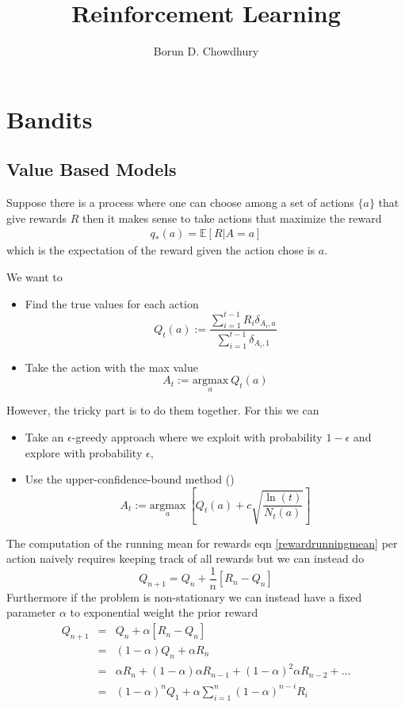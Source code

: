 \documentclass[11pt,a4paper]{article}
\title{Reinforcement Learning}
\author{Borun D. Chowdhury}
\newcommand\be{\begin{equation}}
\newcommand\bea{\begin{eqnarray}}
\newcommand\ee{\end{equation}}
\newcommand\eea{\end{eqnarray}}
\newcommand{\nn}{\nonumber \\}
\newcommand{\e}[1]{\mathbb E[#1]}
\newcommand{\todo}[1]{{\color{cyan}{TODO: #1}}}
\begin{document}
\maketitle

\section{Bandits}


\subsection{Value Based Models}

Suppose there is a process where one can choose among a set of actions $\{a\}$ that give rewards $R$ then it makes sense to take actions that maximize the reward
\bea
q_*(a) = \e{R|A=a}
\eea
which is the expectation of the reward given the action chose is $a$.

We want to 
\begin{itemize}
\item Find the true values for each action
\be
Q_t(a) := \frac{\sum_{i=1}^{t-1} R_i \delta_{A_i,a}}{\sum_{i=1}^{t-1}  \delta_{A_i,1}} \label{rewardrunningmean}
\ee
\item Take the action with the max value
\be
A_t := \underset{a}{\text{argmax}} ~ Q_t(a)
\ee
\end{itemize}

However, the tricky part is to do them together. For this we can 
\begin{itemize}
\item Take an $\epsilon$-greedy approach where we exploit with probability $1-\epsilon$ and explore with probability $\epsilon$,
\item Use the upper-confidence-bound method (\todo{find the math behind this})
\be
A_t := \underset{a}{\text{argmax}} ~ \left[ Q_t(a) + c \sqrt{\frac{\ln(t)}{N_t(a)}}\right]
\ee
\end{itemize}

The computation of the running mean for rewards eqn \ref{rewardrunningmean} per action naively requires keeping track of all rewards but we can instead do
\be
Q_{n+1} = Q_n + \frac{1}{n} [R_n - Q_n]
\ee
Furthermore if the problem is non-stationary we can instead have a fixed parameter $\alpha$ to exponential weight the prior reward
\bea
Q_{n+1} &=& Q_n + \alpha [R_n - Q_n] \nn
&=& (1-\alpha) Q_n + \alpha R_n \nn
&=& \alpha R_n + (1-\alpha) \alpha R_{n-1} + (1-\alpha)^2 \alpha R_{n-2}  + \dots \nn
&=& (1-\alpha)^n Q_1 + \alpha \sum_{i=1}^n (1-\alpha)^{n-i} R_i
\eea
\end{document}
